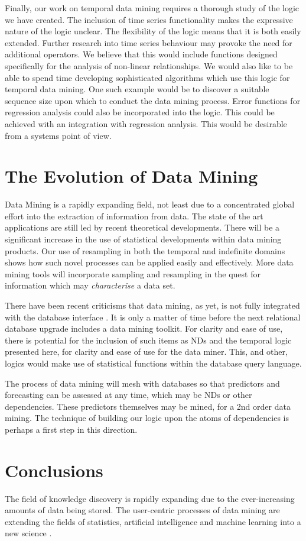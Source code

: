 \medskip

Finally, our work on temporal data mining requires a thorough study of
the logic we have created. The inclusion of time series functionality
makes the expressive nature of the logic unclear. The flexibility of
the logic means that it is both easily extended. Further
research into time series behaviour may provoke the need for
additional operators. We believe that this would include functions
designed specifically for the analysis of non-linear relationships.
We would also like to
be able to spend time developing sophisticated algorithms which use
this logic for temporal data mining. One such example would be to
discover a suitable sequence size upon which to conduct the data
mining process. Error functions for regression analysis could also be
incorporated into the logic. This could be achieved with an integration with
regression analysis. This would be desirable from a 
systems point of view.  

\section{The Evolution of Data Mining}

Data Mining is a rapidly expanding field, not least due to a
concentrated global effort into the extraction of information from
data. The state of the art applications are still led by recent
theoretical developments. There will be a significant increase in the
use of statistical developments within data mining products. Our use
of resampling in both the temporal and indefinite domains shows how
such novel processes can be applied easily and effectively. More data
mining tools will incorporate sampling and resampling in the quest for
information which may {\em characterise} a data set.

\medskip

There have been recent criticisms that data mining, as yet, is not
fully integrated with the database interface \cite{man97,joh97}. It is
only a matter of time before the next relational database upgrade
includes a data mining toolkit. For clarity and ease of use, there is
potential for the inclusion of such items as NDs and the temporal logic
presented here, for clarity and ease of use for the data miner. This,
and other, logics would make use of statistical functions within the
database query language. 

\medskip
The process of data mining will mesh with databases so that predictors
and forecasting can be assessed at any time, which may be NDs or other
dependencies. These predictors
themselves may be mined, for a 2nd order data mining.
The technique of building our logic
upon the atoms of dependencies is perhaps a first step in this direction. 

\section{Conclusions}

The field of knowledge discovery is rapidly expanding due to the
ever-increasing amounts of data being stored. The user-centric
processes of data mining are extending the fields of statistics,
artificial intelligence and machine learning into a new science
\cite{fu96}. 




